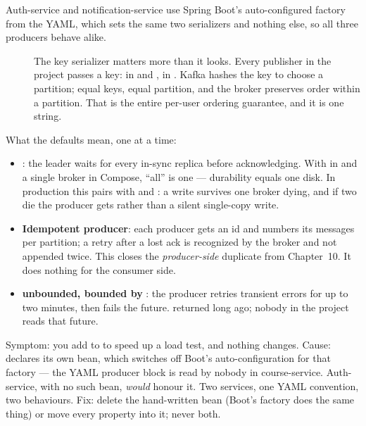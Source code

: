 Auth-service and notification-service use Spring Boot's auto-configured
factory from the YAML, which sets the same two serializers and nothing
else, so all three producers behave alike.

\begin{description}
  \item[] The key serializer matters more than it looks. Every
  publisher in the project passes a key:  in
   and ,
   in . Kafka hashes
  the key to choose a partition; equal keys, equal partition, and the
  broker preserves order within a partition. That is the entire
  per-user ordering guarantee, and it is one string.
\end{description}

What the defaults mean, one at a time:

\begin{itemize}
  \item \textbf{}: the leader waits for every in-sync
  replica before acknowledging. With  in
   and a single broker in Compose, ``all'' is
  one --- durability equals one disk. In production this pairs with
   and : a
  write survives one broker dying, and if two die the producer gets
   rather than a silent single-copy write.
  \item \textbf{Idempotent producer}: each producer gets an id and
  numbers its messages per partition; a retry after a lost ack is
  recognized by the broker and not appended twice. This closes the
  \emph{producer-side} duplicate from Chapter~10. It does nothing for
  the consumer side.
  \item \textbf{ unbounded, bounded by
  }: the producer retries transient errors for
  up to two minutes, then fails the future.  returned long
  ago; nobody in the project reads that future.
\end{itemize}

\begin{pitfall}
Symptom: you add  to
 to speed up a load test, and nothing changes.
Cause:  declares its own
 bean, which switches off Boot's
auto-configuration for that factory --- the YAML producer block is read
by nobody in course-service. Auth-service, with no such bean,
\emph{would} honour it. Two services, one YAML convention, two
behaviours. Fix: delete the hand-written bean (Boot's factory does the
same thing) or move every property into it; never both.
\end{pitfall}

